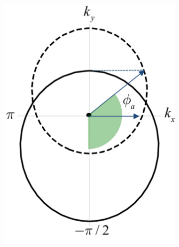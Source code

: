     \begin{figure}[H]
        \centering
        \begin{subfigure}[b]{0.4\linewidth}
            \includegraphics[width = \linewidth]{fig/Chap 2/anomalous fermi surface1.png}
            \caption{}
            \label{2fig:anomalous fermi surface1}
        \end{subfigure}
        \begin{subfigure}[b]{0.4\linewidth}

\end{subfigure}
\end{figure}
